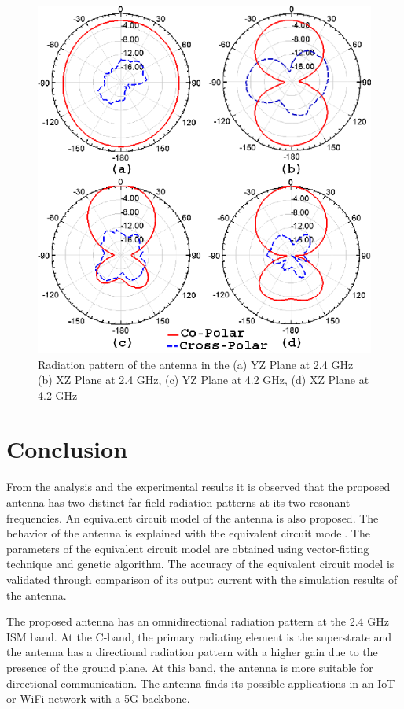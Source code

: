 \begin{figure}[h]
\centering
\includegraphics[width=0.5\linewidth]{Fig-aeue_7.eps}
\caption{Radiation pattern of the antenna in the (a) YZ Plane at 2.4 GHz (b) XZ Plane at 2.4 GHz, (c) YZ Plane at 4.2 GHz, (d) XZ Plane at 4.2 GHz}\label{fig-pat}
\end{figure}

\section{Conclusion}\label{c4sec:concl}
From the analysis and the experimental results it is observed that the proposed antenna has two distinct far-field radiation patterns at its two resonant frequencies. An equivalent circuit model of the antenna is also proposed. The behavior of the antenna is explained with the equivalent circuit model. The parameters of the equivalent circuit model are obtained using vector-fitting technique and genetic algorithm. The accuracy of the equivalent circuit model is validated through comparison of its output current with the simulation results of the antenna.

The proposed antenna has an omnidirectional radiation pattern at the 2.4 GHz ISM band. At the C-band, the primary radiating element is the superstrate and the antenna has a directional radiation pattern with a higher gain due to the presence of the ground plane. At this band, the antenna is more suitable for directional communication. The antenna finds its possible applications in an IoT or WiFi network with a 5G backbone. 